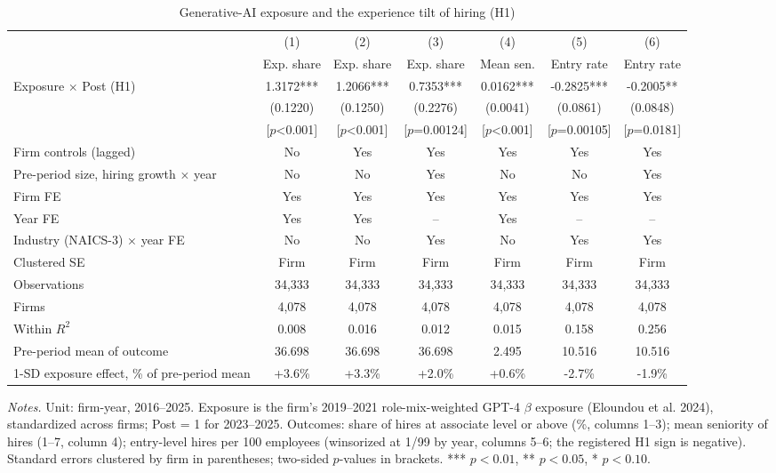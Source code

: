\begin{table}[!htbp]\centering\footnotesize\setlength{\tabcolsep}{4pt}
\caption{Generative-AI exposure and the experience tilt of hiring (H1)}\label{tab:h1}
\begin{tabular*}{\linewidth}{@{\extracolsep{\fill}}lcccccc@{}}
\toprule
 & (1) & (2) & (3) & (4) & (5) & (6) \\
 & Exp. share & Exp. share & Exp. share & Mean sen. & Entry rate & Entry rate \\
\midrule
Exposure $\times$ Post (H1) & 1.3172*** & 1.2066*** & 0.7353*** & 0.0162*** & -0.2825*** & -0.2005** \\
 & (0.1220) & (0.1250) & (0.2276) & (0.0041) & (0.0861) & (0.0848) \\
 & [$p$<0.001] & [$p$<0.001] & [$p$=0.00124] & [$p$<0.001] & [$p$=0.00105] & [$p$=0.0181] \\
\midrule
Firm controls (lagged) & No & Yes & Yes & Yes & Yes & Yes \\
Pre-period size, hiring growth $\times$ year & No & No & Yes & No & No & Yes \\
Firm FE & Yes & Yes & Yes & Yes & Yes & Yes \\
Year FE & Yes & Yes & -- & Yes & -- & -- \\
Industry (NAICS-3) $\times$ year FE & No & No & Yes & No & Yes & Yes \\
Clustered SE & Firm & Firm & Firm & Firm & Firm & Firm \\
Observations & 34,333 & 34,333 & 34,333 & 34,333 & 34,333 & 34,333 \\
Firms & 4,078 & 4,078 & 4,078 & 4,078 & 4,078 & 4,078 \\
Within $R^2$ & 0.008 & 0.016 & 0.012 & 0.015 & 0.158 & 0.256 \\
Pre-period mean of outcome & 36.698 & 36.698 & 36.698 & 2.495 & 10.516 & 10.516 \\
1-SD exposure effect, \% of pre-period mean & +3.6\% & +3.3\% & +2.0\% & +0.6\% & -2.7\% & -1.9\% \\
\bottomrule
\end{tabular*}
\begin{minipage}{0.97\linewidth}\vspace{2pt}\scriptsize\textit{Notes.} Unit: firm-year, 2016--2025. Exposure is the firm's 2019--2021 role-mix-weighted GPT-4 $\beta$ exposure (Eloundou et al. 2024), standardized across firms; Post = 1 for 2023--2025. Outcomes: share of hires at associate level or above (\%, columns 1--3); mean seniority of hires (1--7, column 4); entry-level hires per 100 employees (winsorized at 1/99 by year, columns 5--6; the registered H1 sign is negative). Standard errors clustered by firm in parentheses; two-sided $p$-values in brackets. *** $p<0.01$, ** $p<0.05$, * $p<0.10$.\end{minipage}
\end{table}